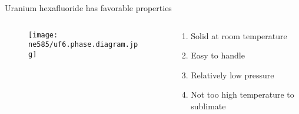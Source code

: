 \documentclass[aspectratio=1610,pdftex,dvipsnames,compress,xcolor={dvipsnames}]{beamer}
\begin{document}
\begin{frame}{Uranium hexafluoride has favorable properties}
    \begin{columns}

        \begin{column}{0.45\textwidth}
            \begin{figure}
                \centering
                \texttt{[image: ne585/uf6.phase.diagram.jpg]}
            \end{figure}
        \end{column}

        \begin{column}{0.55\textwidth}
            \begin{enumerate}[series=outerlist,topsep=0pt,itemsep=21pt,leftmargin=*,label=(\arabic*)]
                \item[]Solid at room temperature
                \item[]Easy to handle
                \item[]Relatively low pressure
                \item[]Not too high temperature to sublimate
            \end{enumerate}
        \end{column}

    \end{columns}
\end{frame}
\end{document}
